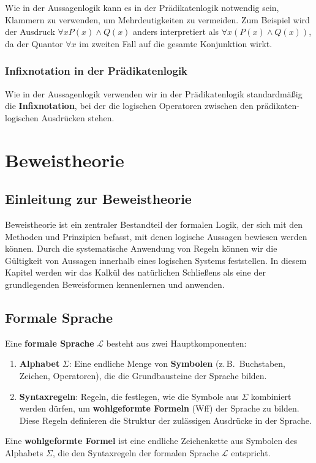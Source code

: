 \documentclass[main.tex]{subfiles}
\begin{document}
\begin{remark}
Wie in der Aussagenlogik kann es in der Prädikatenlogik notwendig sein, Klammern zu verwenden, um Mehrdeutigkeiten zu vermeiden. Zum Beispiel wird der Ausdruck \(\forall x P(x) \land Q(x)\) anders interpretiert als \(\forall x (P(x) \land Q(x))\), da der Quantor \(\forall x\) im zweiten Fall auf die gesamte Konjunktion wirkt.
\end{remark}

\subsection{Infixnotation in der Prädikatenlogik}

Wie in der Aussagenlogik verwenden wir in der Prädikatenlogik standardmäßig die \textbf{Infixnotation}, bei der die logischen Operatoren zwischen den prädikaten-logischen Ausdrücken stehen.

\chapter{Beweistheorie}

\section{Einleitung zur Beweistheorie}
Beweistheorie ist ein zentraler Bestandteil der formalen Logik, der sich mit den Methoden und Prinzipien befasst, mit denen logische Aussagen bewiesen werden können. Durch die systematische Anwendung von Regeln können wir die Gültigkeit von Aussagen innerhalb eines logischen Systems feststellen. In diesem Kapitel werden wir das Kalkül des natürlichen Schließens als eine der grundlegenden Beweisformen kennenlernen und anwenden.

\section{Formale Sprache}

\begin{definition}
Eine \textbf{formale Sprache} \(\mathcal{L}\) besteht aus zwei Hauptkomponenten:

\begin{enumerate}
    \item \textbf{Alphabet} \( \Sigma \): Eine endliche Menge von \textbf{Symbolen} (z.\,B.\ Buchstaben, Zeichen, Operatoren), die die Grundbausteine der Sprache bilden.
    \item \textbf{Syntaxregeln}: Regeln, die festlegen, wie die Symbole aus \( \Sigma \) kombiniert werden dürfen, um \textbf{wohlgeformte Formeln} (Wff) der Sprache zu bilden. Diese Regeln definieren die Struktur der zulässigen Ausdrücke in der Sprache.
\end{enumerate}

Eine \textbf{wohlgeformte Formel} ist eine endliche Zeichenkette aus Symbolen des Alphabets \( \Sigma \), die den Syntaxregeln der formalen Sprache \(\mathcal{L}\) entspricht.
\end{definition}
\end{document}
